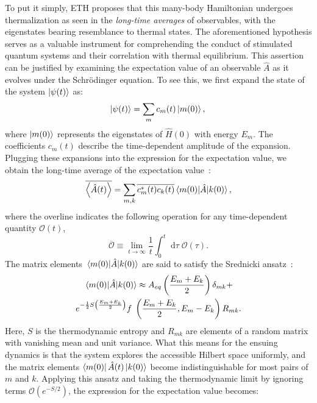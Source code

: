 \documentclass[%
reprint,
superscriptaddress,
amsmath,amssymb,
aps,
prb,
showkeys,
]{revtex4-2}
\begin{document}
To put it simply, ETH proposes that this many-body Hamiltonian undergoes thermalization as seen in the \textit{long-time averages} of observables, with the eigenstates bearing resemblance to thermal states. The aforementioned hypothesis serves as a valuable instrument for comprehending the conduct of stimulated quantum systems and their correlation with thermal equilibrium. This assertion can be justified by examining the expectation value of an observable $\hat{A}$ as it evolves under the Schr\"odinger equation. To see this, we first expand the state of the system $\ket{\psi(t)}$ as:
\begin{equation*}
	\ket{\psi(t)} =  \sum_m c_m(t)\ket{m(0)},\\ 
\end{equation*}
where $\ket{m(0)}$ represents the eigenstates of $\hat{H}(0)$ with energy $E_m$. The coefficients $c_m (t)$ describe the time-dependent amplitude of the expansion.
Plugging these expansions into the expression for the expectation value, we obtain the long-time average of the expectation value~\cite{abanin_colloquium_2019}:
\begin{equation}
	\overline{\expval{\hat{A}(t)}} 
	= \sum_{m,k} \overline{c_m^\ast(t) c_k(t)}
	\mel{m(0)}{\hat{A}}{k(0)},
\end{equation}
where the overline indicates the following operation for any time-dependent quantity $\mathcal{O}(t)$, 
\begin{equation}
	\overline{{\mathcal{O}}} \equiv \lim_{t\rightarrow\infty}\frac{1}{t}\int^t_0\;\mathrm{d}\tau\; {\mathcal{O}(\tau)} .
	\label{eq:lt_avg}
\end{equation}
The matrix elements $\mel{m(0)}{\hat{A}}{k(0)}$ are said to satisfy the Srednicki ansatz~\cite{Srednicki1994,Srednicki_1999}:
\begin{multline}
	\mel{m(0)}{\hat{A}}{k(0)} \approx A_{eq}\left(\frac{E_m+E_k}{2}\right) \delta_{mk} +\\ e^{-\frac{1}{2} S\left(\frac{E_m+E_k}{2}\right)} f\;\left(\frac{E_m+E_k}{2}, E_m-E_k\right)R_{mk}.
\end{multline}
Here, $S$ is the thermodynamic entropy and $R_{mk}$ are elements of a random matrix with vanishing mean and unit variance. What this means for the ensuing dynamics is that the system explores the accessible Hilbert space uniformly,  and the matrix elements $\bra{m(0)}\hat{A}(t)\ket{k(0)}$ become indistinguishable for most pairs of $m$ and $k$.
Applying this ansatz and taking the thermodynamic limit by ignoring terms $\mathcal{O}(e^{-S/2})$, the expression for the expectation value becomes:
\end{document}
